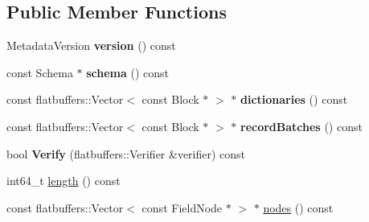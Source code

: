 \subsection*{Public Member Functions}
\begin{DoxyCompactItemize}
\item 
Metadata\+Version {\bfseries version} () const \hypertarget{structorg_1_1apache_1_1arrow_1_1flatbuf_1_1FLATBUFFERS__FINAL__CLASS_a581ef6387b085df698f948cfeb515f3c}{}\label{structorg_1_1apache_1_1arrow_1_1flatbuf_1_1FLATBUFFERS__FINAL__CLASS_a581ef6387b085df698f948cfeb515f3c}

\item 
const Schema $\ast$ {\bfseries schema} () const \hypertarget{structorg_1_1apache_1_1arrow_1_1flatbuf_1_1FLATBUFFERS__FINAL__CLASS_aeba86820c609cf2d71eec23f3c7e5629}{}\label{structorg_1_1apache_1_1arrow_1_1flatbuf_1_1FLATBUFFERS__FINAL__CLASS_aeba86820c609cf2d71eec23f3c7e5629}

\item 
const flatbuffers\+::\+Vector$<$ const Block $\ast$ $>$ $\ast$ {\bfseries dictionaries} () const \hypertarget{structorg_1_1apache_1_1arrow_1_1flatbuf_1_1FLATBUFFERS__FINAL__CLASS_abda5fb64a31fe9a7d9060a0f095e45f2}{}\label{structorg_1_1apache_1_1arrow_1_1flatbuf_1_1FLATBUFFERS__FINAL__CLASS_abda5fb64a31fe9a7d9060a0f095e45f2}

\item 
const flatbuffers\+::\+Vector$<$ const Block $\ast$ $>$ $\ast$ {\bfseries record\+Batches} () const \hypertarget{structorg_1_1apache_1_1arrow_1_1flatbuf_1_1FLATBUFFERS__FINAL__CLASS_a8b3739f0d2625d3ea75f873e47b261ff}{}\label{structorg_1_1apache_1_1arrow_1_1flatbuf_1_1FLATBUFFERS__FINAL__CLASS_a8b3739f0d2625d3ea75f873e47b261ff}

\item 
bool {\bfseries Verify} (flatbuffers\+::\+Verifier \&verifier) const \hypertarget{structorg_1_1apache_1_1arrow_1_1flatbuf_1_1FLATBUFFERS__FINAL__CLASS_af3e217fc40beb9b315e3979010413969}{}\label{structorg_1_1apache_1_1arrow_1_1flatbuf_1_1FLATBUFFERS__FINAL__CLASS_af3e217fc40beb9b315e3979010413969}

\item 
int64\+\_\+t \hyperlink{structorg_1_1apache_1_1arrow_1_1flatbuf_1_1FLATBUFFERS__FINAL__CLASS_a4c8b89371bd76124e94a00a7044d9f69}{length} () const 
\item 
const flatbuffers\+::\+Vector$<$ const Field\+Node $\ast$ $>$ $\ast$ \hyperlink{structorg_1_1apache_1_1arrow_1_1flatbuf_1_1FLATBUFFERS__FINAL__CLASS_aa4ecd50311e1db74c5ab26d4626396eb}{nodes} () const \hypertarget{structorg_1_1apache_1_1arrow_1_1flatbuf_1_1FLATBUFFERS__FINAL__CLASS_aa4ecd50311e1db74c5ab26d4626396eb}{}\label{structorg_1_1apache_1_1arrow_1_1flatbuf_1_1FLATBUFFERS__FINAL__CLASS_aa4ecd50311e1db74c5ab26d4626396eb}


\end{DoxyCompactItemize}
